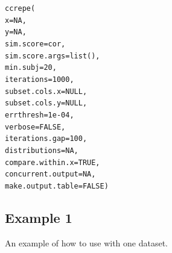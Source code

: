 \documentclass{article}\usepackage[]{graphicx}\usepackage[usenames,dvipsnames]{color}
\newcommand{\hlnum}[1]{\textcolor[rgb]{0.816,0.125,0.439}{#1}}%
\newcommand{\hlstd}[1]{\textcolor[rgb]{0.251,0.251,0.251}{#1}}%
\newcommand{\hlkwa}[1]{\textcolor[rgb]{0.125,0.125,0.941}{#1}}%
\newcommand{\hlkwc}[1]{\textcolor[rgb]{0.251,0.251,0.251}{#1}}%
\newcommand{\hlkwd}[1]{\textcolor[rgb]{0.878,0.439,0.125}{#1}}%
\newenvironment{knitrout}{}{} %
\begin{document}
\begin{knitrout}
\color{fgcolor}\begin{kframe}
\begin{alltt}
\hlkwd{ccrepe}\hlstd{(}
 \hlkwc{x} \hlstd{=} \hlnum{NA}\hlstd{,}
 \hlkwc{y} \hlstd{=} \hlnum{NA}\hlstd{,}
 \hlkwc{sim.score} \hlstd{= cor,}
 \hlkwc{sim.score.args} \hlstd{=} \hlkwd{list}\hlstd{(),}
 \hlkwc{min.subj} \hlstd{=} \hlnum{20}\hlstd{,}
 \hlkwc{iterations} \hlstd{=} \hlnum{1000}\hlstd{,}
 \hlkwc{subset.cols.x} \hlstd{=} \hlkwa{NULL}\hlstd{,}
 \hlkwc{subset.cols.y} \hlstd{=} \hlkwa{NULL}\hlstd{,}
 \hlkwc{errthresh}  \hlstd{=} \hlnum{1e-04}\hlstd{,}
 \hlkwc{verbose} \hlstd{=} \hlnum{FALSE}\hlstd{,}
 \hlkwc{iterations.gap} \hlstd{=} \hlnum{100}\hlstd{,}
 \hlkwc{distributions} \hlstd{=} \hlnum{NA}\hlstd{,}
 \hlkwc{compare.within.x} \hlstd{=} \hlnum{TRUE}\hlstd{,}
 \hlkwc{concurrent.output} \hlstd{=} \hlnum{NA}\hlstd{,}
 \hlkwc{make.output.table} \hlstd{=} \hlnum{FALSE}\hlstd{)}
\end{alltt}
\end{kframe}
\end{knitrout}

\subsection{Example 1}

An example of how to use  with one dataset.
\end{document}
